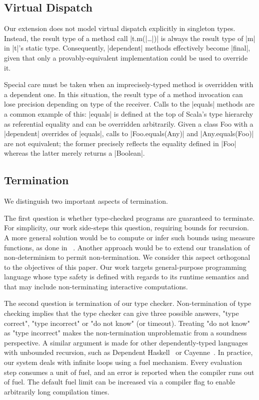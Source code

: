 \subsection{Virtual Dispatch}

Our extension does not model virtual dispatch explicitly in singleton types.
Instead, the result type of a method call |t.m(|\ldots{}|)| is always the result type of |m| in |t|'s static type.
Consequently, |dependent| methods effectively become |final|, given that only a provably-equivalent implementation could be used to override it.

Special care must be taken when an imprecisely-typed method is overridden with a dependent one.
In this situation, the result type of a method invocation can lose precision depending on type of the receiver.
Calls to the |equals| methods are a common example of this: |equals| is defined at the top of Scala's type hierarchy as referential equality and can be overridden arbitrarily.
Given a class Foo with a |dependent| overrides of |equals|, calls to |Foo.equals(Any)| and |Any.equals(Foo)| are not equivalent; the former precisely reflects the equality defined in |Foo| whereas the latter merely returns a |Boolean|.

\subsection{Termination}

We distinguish two important aspects of termination.

The first question is whether type-checked programs are guaranteed to terminate.
For simplicity, our work side-steps this question, requiring bounds for recursion.
A more general solution would be to compute or infer such bounds using measure functions, as done in \FR~\citep{hamza2019system}.
Another approach would be to extend our translation of non-determinism to permit non-termination.
We consider this aspect orthogonal to the objectives of this paper.
Our work targets general-purpose programming language whose type safety is defined with regards to its runtime semantics and that may include non-terminating interactive computations.

The second question is termination of our type checker.
Non-termination of type checking implies that the type checker can give three possible answers, "type correct", "type incorrect" or "do not know" (or timeout).
Treating "do not know" as "type incorrect" makes the non-termination unproblematic from a soundness perspective.
A similar argument is made for other dependently-typed languages with unbounded recursion, such as Dependent Haskell~\citep{eisenberg2016dependent} or Cayenne~\citep{augustsson1998cayenne}.
In practice, our system deals with infinite loops using a fuel mechanism.
Every evaluation step consumes a unit of fuel, and an error is reported when the compiler runs out of fuel.
The default fuel limit can be increased via a compiler flag to enable arbitrarily long compilation times.

